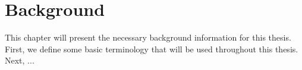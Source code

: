 \chapter{Background}\label{ch:Background}
This chapter will present the necessary background information for this thesis. First, we define some basic terminology that will be used throughout this thesis. Next, ...
